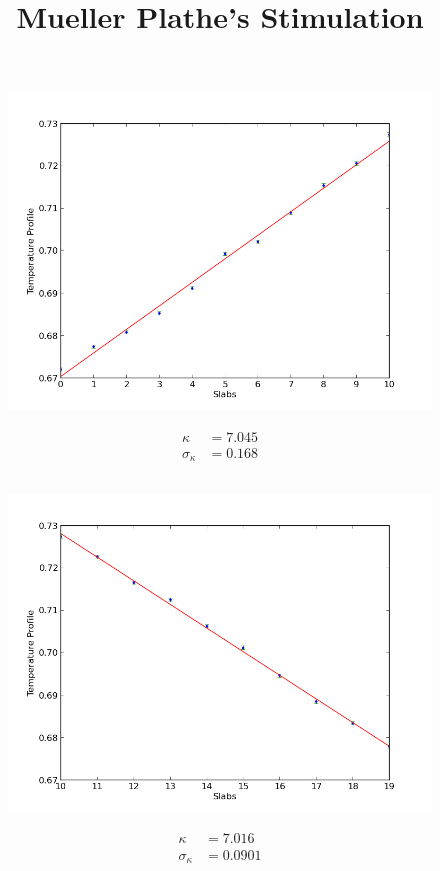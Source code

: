 \documentclass[12pt,a4paper]{article}
\author{}
\date{}
\title{Mueller Plathe's Stimulation}
\begin{document}
\maketitle
\section{}
\subsection*{} 
\begin{figure}[h]
  \includegraphics[width=\linewidth]{TemperatureProfile.png}
\end{figure}
\begin{align*}
 \kappa &= 7.045 \\
 \sigma_\kappa&=0.168
\end{align*}
\subsection*{}
\begin{figure}[!htb]
  \includegraphics[width=\linewidth]{TemperatureProfile-.png}
\end{figure}
\begin{align*}
\kappa &=7.016  \\
\sigma_\kappa &=0.0901
\end{align*}
\newpage
\end{document}
